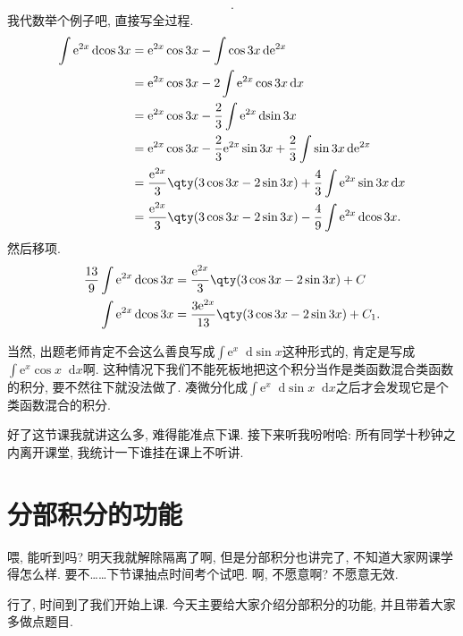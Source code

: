 \documentclass{ctexbook}
\newcommand{\e}{\mathrm{e}}
\newcommand*{\dif}{\mathop{}\!\mathrm{d}}
\begin{document}
{\begin{align*}
.\end{align*}
我代数举个例子吧, 直接写全过程. 
\begin{align*}
\int\e^{2x}\dif{\cos{3x}}={}&\e^{2x}\cos{3x}-\int\cos{3x}\dif{\e^{2x}}\\
={}&\e^{2x}\cos{3x}-2\int\e^{2x}\cos{3x}\dif{x}\\
={}&\e^{2x}\cos{3x}-\frac{2}{3}\int\e^{2x}\dif{\sin{3x}}\\
={}&\e^{2x}\cos{3x}-\frac{2}{3}\e^{2x}\sin{3x}+\frac{2}{3}\int\sin{3x}\dif{\e^{2x}}\\
={}&\frac{\e^{2x}}{3}\qty(3\cos{3x}-2\sin{3x})+\frac{4}{3}\int\e^{2x}\sin{3x}\dif{x}\\
={}&\frac{\e^{2x}}{3}\qty(3\cos{3x}-2\sin{3x})-\frac{4}{9}\int\e^{2x}\dif{\cos{3x}}
.\end{align*}
然后移项. 
\begin{align*}
\frac{13}{9}\int\e^{2x}\dif{\cos{3x}}={}&\frac{\e^{2x}}{3}\qty(3\cos{3x}-2\sin{3x})+C\\
\int\e^{2x}\dif{\cos{3x}}={}&\frac{3\e^{2x}}{13}\qty(3\cos{3x}-2\sin{3x})+C_{1}
.\end{align*}\par
当然, 出题老师肯定不会这么善良写成$\int\e^{x}\dif{\sin{x}}$这种形式的, 肯定是写成$\int\e^{x}\cos{x}\dif{x}$啊. 这种情况下我们不能死板地把这个积分当作是\uppercase\expandafter{}类函数混合\uppercase\expandafter{}类函数的积分, 要不然往下就没法做了. 凑微分化成$\int\e^{x}\dif{\sin{x}}\dif{x}$之后才会发现它是个\uppercase\expandafter{}类函数混合的积分. \par
好了这节课我就讲这么多, 难得能准点下课. 接下来听我吩咐哈: 所有同学十秒钟之内离开课堂, 我统计一下谁挂在课上不听讲. \par
\section{分部积分的功能}
喂, 能听到吗? 明天我就解除隔离了啊, 但是分部积分也讲完了, 不知道大家网课学得怎么样. 要不……下节课抽点时间考个试吧. 啊, 不愿意啊? 不愿意无效. \par
行了, 时间到了我们开始上课. 今天主要给大家介绍分部积分的功能, 并且带着大家多做点题目. \par
}
\end{document}
